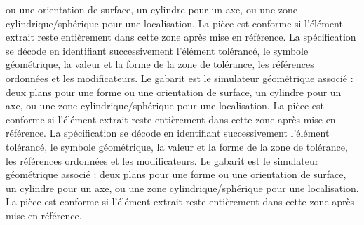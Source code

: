 \begin{corrigebox}
                ou une orientation de surface, un cylindre pour un axe, ou une zone
                cylindrique/sphérique pour une localisation. La pièce est conforme si
                l'élément extrait reste entièrement dans cette zone après mise en référence.
La spécification se décode en identifiant successivement
                l'élément tolérancé, le symbole géométrique, la valeur et la forme de la
                zone de tolérance, les références ordonnées et les modificateurs. Le
                gabarit est le simulateur géométrique associé : deux plans pour une forme
                ou une orientation de surface, un cylindre pour un axe, ou une zone
                cylindrique/sphérique pour une localisation. La pièce est conforme si
                l'élément extrait reste entièrement dans cette zone après mise en référence.
La spécification se décode en identifiant successivement
                l'élément tolérancé, le symbole géométrique, la valeur et la forme de la
                zone de tolérance, les références ordonnées et les modificateurs. Le
                gabarit est le simulateur géométrique associé : deux plans pour une forme
                ou une orientation de surface, un cylindre pour un axe, ou une zone
                cylindrique/sphérique pour une localisation. La pièce est conforme si
                l'élément extrait reste entièrement dans cette zone après mise en référence.
\end{corrigebox}

